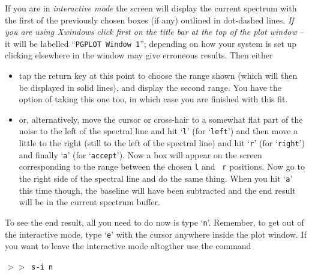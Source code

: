 \documentclass[11pt,twoside]{article}
\newcommand{\SP}{{$>\!>$}}
\begin{document}
If you are in {\it interactive mode} the screen will display the current
spectrum with the first of the previously chosen boxes (if any)
outlined in dot-dashed lines. {\it If you are using Xwindows click
first on the title bar at the top of the plot window} -- it will be
labelled ``{\tt{PGPLOT Window 1}}''; depending on how your system is
set up clicking elsewhere in the window may give erroneous results.
Then either
\begin{itemize}
\item
tap the return key at this point to choose the range shown (which will
then be displayed in solid lines), and display the second range. You
have the option of taking this one too, in which case you are finished
with this fit.
\item
or, alternatively, move the cursor or cross-hair to a somewhat flat
part of the noise to the left of the spectral line and hit `{\tt{l}}'
(for `{\tt{left}}') and then move a little to the right (still to the
left of the spectral line) and hit `{\tt{r}}' (for `{\tt{right}}') and
finally `{\tt{a}}' (for `{\tt{accept}}').  Now a box will appear on the
screen corresponding to the range between the chosen {\tt l} and {\tt
r} positions.  Now go to the right side of the spectral line and do
the same thing.  When you hit `{\tt{a}}' this time though, the baseline
will have been subtracted and the end result will be in the current
spectrum buffer.
\end{itemize}
To see the end result, all you need to do now is type `{\tt{n}}'.
Remember, to get out of the interactive mode, type `{\tt{e}}' with the
cursor anywhere inside the plot window. If you want to leave the
interactive mode altogther use the command

\SP\ \verb|s-i n|
\end{document}
